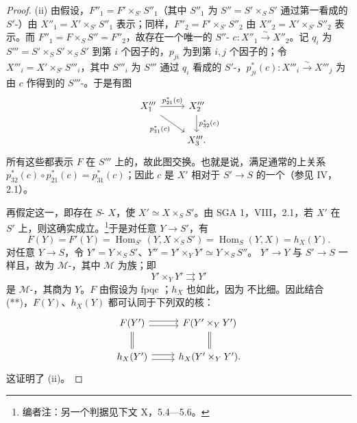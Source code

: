 \begin{proof}
(ii) 由假设，$F''_1=F'\times_{S'}S''_1$（其中 $S''_1$ 为 $S''=S'\times_SS'$ 通过第一看成的 $S'$-）由 $X''_1=X'\times_{S'}S''_1$ 表示；同样，$F''_2=F'\times_{S'}S''_2$ 由 $X''_2=X'\times_{S'}S''_2$ 表示。而 $F''_1=F\times_SS''=F''_2$，故存在一个唯一的 $S''$- $c:X''_1\xrightarrow{\sim}X''_2$。记 $q_i$ 为 $S'''=S'\times_SS'\times_SS'$ 到第 $i$ 个因子的，$p_{ji}$ 为到第 $i,j$ 个因子的；令 $X'''_i=X'\times_{S'}S'''_i$，其中 $S'''_i$ 为 $S'''$ 通过 $q_i$ 看成的 $S'$-，$p_{ji}^*(c):X'''_i\xrightarrow{\sim}X'''_j$ 为由 $c$ 作得到的 $S'''$-。于是有图
\[
\begin{tikzcd}
X'''_1 \arrow[r,"p_{21}^*(c)"] \arrow[dr,"p_{31}^*(c)"'] & X'''_2 \arrow[d,"p_{32}^*(c)"]\\
&X'''_3.
\end{tikzcd}
\]
所有这些都表示 $F$ 在 $S'''$ 上的，故此图交换。也就是说，满足通常的上关系 $p_{32}^*(c)\circ p_{21}^*(c)=p_{31}^*(c)$；因此 $c$ 是 $X'$ 相对于 $S'\to S$ 的一个（参见 IV，2.1）。

再假定这一，即存在 $S$- $X$，使 $X'\simeq X\times_SS'$。由 SGA 1，VIII，2.1，若 $X'$ 在 $S'$ 上，则这确实成立。\footnote[10]{编者注：另一个判据见下文 X，5.4—5.6。}于是对任意 $Y\to S'$，有
\[
F(Y)=F'(Y)=\operatorname{Hom}_{S'}(Y,X\times_SS')=\operatorname{Hom}_S(Y,X)=h_X(Y).\tag{**}
\]
对任意 $Y\to S$，令 $Y'=Y\times_SS'$、$Y''=Y'\times_YY'\simeq Y\times_SS''$。 $Y'\to Y$ 与 $S'\to S$ 一样且，故为 $\mathcal M$-，其中 $\mathcal M$ 为族；即
\[
Y'\times_YY'\rightrightarrows Y'
\]
是 $\mathcal M$-，其商为 $Y$。$F$ 由假设为 fpqc ；$h_X$ 也如此，因为 不比细。因此结合 (**)，$F(Y)$、$h_X(Y)$ 都可认同于下列双的核：
\[
\begin{tikzcd}
F(Y') \arrow[r,shift left] \arrow[r,shift right] & F(Y'\times_YY')\\
h_X(Y') \arrow[r,shift left] \arrow[r,shift right] \arrow[u,equal] & h_X(Y'\times_YY') \arrow[u,equal].
\end{tikzcd}
\]
这证明了 (ii)。
\end{proof}
